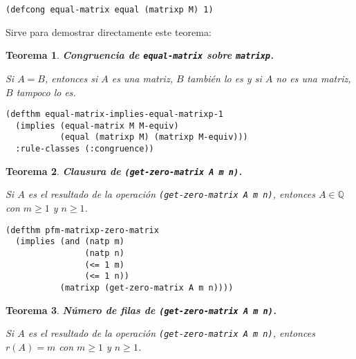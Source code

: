 \documentclass[a4paper,10pt]{article}
\newcommand{\Q}[1]{#1 \in \mathbb{Q}}
\newtheorem{teor}{{Teorema}}
\begin{document}
\par \vspace{10pt}

\begin{lstlisting}[language=clips]
(defcong equal-matrix equal (matrixp M) 1)
\end{lstlisting}

\par \vspace{10pt}

Sirve para demostrar directamente este teorema:

\par \vspace{16pt}

\begin{teor} \textbf{Congruencia de \texttt{equal-matrix} sobre \texttt{matrixp}.}\vspace{8pt}\par
Si $A = B$, entonces si $A$ es una matriz, $B$ también lo es y si $A$ no es una matriz, $B$ tampoco lo es.
\end{teor}

\begin{lstlisting}[language=clips]
(defthm equal-matrix-implies-equal-matrixp-1
  (implies (equal-matrix M M-equiv)
           (equal (matrixp M) (matrixp M-equiv)))
  :rule-classes (:congruence))
\end{lstlisting}

\par \vspace{16pt}

\begin{teor} \textbf{Clausura de \texttt{(get-zero-matrix A m n)}.}\vspace{8pt}\par
Si $A$ es el resultado de la operación \texttt{(get-zero-matrix A m n)}, entonces $\Q{A}$ con $m \geq 1$ y $n \geq 1$.
\end{teor}

\begin{lstlisting}[language=clips]
(defthm pfm-matrixp-zero-matrix
  (implies (and (natp m)
                (natp n)
                (<= 1 m)
                (<= 1 n))
           (matrixp (get-zero-matrix A m n))))
\end{lstlisting}

\par \vspace{16pt}

\begin{teor} \textbf{Número de filas de \texttt{(get-zero-matrix A m n)}.}\vspace{8pt}\par
Si $A$ es el resultado de la operación \texttt{(get-zero-matrix A m n)}, entonces $r(A)=m$ con $m \geq 1$ y $n \geq 1$.
\end{teor}
\end{document}
